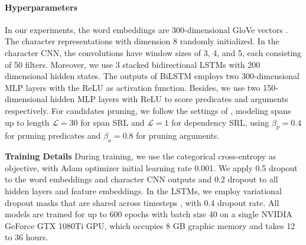 \documentclass[letterpaper]{article} %
\begin{document}
\paragraph{Hyperparameters}

In our experiments, the word embeddings are 300-dimensional GloVe vectors \cite{penningtonEMNLP2014}. The character representations with dimension 8 randomly initialized. In the character CNN, the convolutions  have window sizes of 3, 4, and 5, each consisting of 50 filters. Moreover, we use 3 stacked bidirectional LSTMs with 200 dimensional hidden states. The outputs of BiLSTM employs two 300-dimensional MLP layers with the ReLU as activation function.
Besides, we use two 150-dimensional hidden MLP layers with ReLU to score predicates and arguments respectively. For candidates pruning, we follow the settings of \citeauthor{he2018jointly} , modeling spans up to length $\mathcal{L}=30$ for span SRL and $\mathcal{L}=1$ for dependency SRL, using $\beta_p=0.4$ for pruning predicates and $\beta_a=0.8$ for pruning arguments.


\noindent \textbf{Training Details} \quad
During training, we use the categorical cross-entropy as objective, with Adam optimizer \cite{adam2015} initial learning rate 0.001. We apply 0.5 dropout to the word embeddings and character CNN outputs and 0.2 dropout to all hidden layers and feature embeddings. In the LSTMs, we employ variational dropout masks that are shared across timesteps \cite{gal2016}, with 0.4 dropout rate. All models are trained for up to 600 epochs with batch size 40 on a single NVIDIA GeForce GTX 1080Ti GPU, which occupies 8 GB graphic memory and takes 12 to 36 hours.
\end{document}
